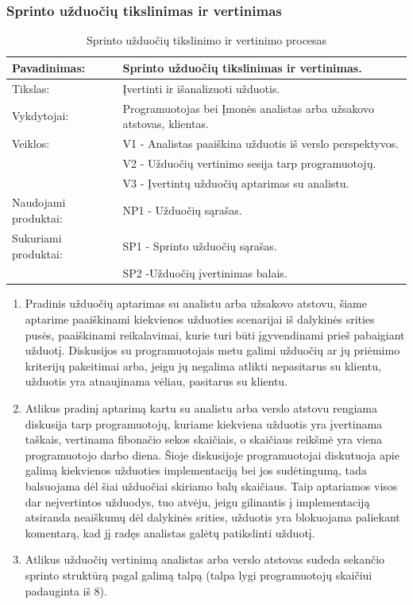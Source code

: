 \documentclass{VUMIFPSkursinis}
\begin{document}
	\subsubsection{Sprinto užduočių tikslinimas ir vertinimas}
	\begin{center}
		\begin{table}[ht]
			\caption{Sprinto užduočių tikslinimo ir vertinimo procesas}
		\begin{tabular}{ | l | l | } 
		\hline
	Pavadinimas:         & Sprinto užduočių tikslinimas ir vertinimas.          		 					 \\ \hline
	Tikslas: 	           & Įvertinti ir išanalizuoti užduotis. 																	\\ \hline
	Vykdytojai:          & Programuotojas bei Įmonės analistas arba užsakovo atstovas, klientas.  \\ \hline
	Veiklos:             & V1 - Analistas paaiškina užduotis iš verslo perspektyvos. 		          \\
											 & V2 - Užduočių vertinimo sesija tarp programuotojų.					             \\
											 & V3 - Įvertintų užduočių aptarimas su analistu. 									          \\ \hline
	Naudojami produktai: & NP1 - Užduočių sąrašas. 													 							           \\ \hline
	Sukuriami produktai: & SP1 - Sprinto užduočių sąrašas. 																	          \\ 
											 & SP2 -Užduočių įvertinimas balais.										           \\ \hline
\end{tabular}
\end{table}
\end{center}
\begin{enumerate}
	\item Pradinis užduočių aptarimas su analistu arba užsakovo atstovu, šiame aptarime paaiškinami kiekvienos užduoties scenarijai iš dalykinės srities pusės, paaiškinami reikalavimai, kurie turi būti įgyvendinami prieš pabaigiant užduotį. Diskusijos su programuotojais metu galimi užduočių ar jų priėmimo kriterijų pakeitimai arba, jeigu jų negalima atlikti nepasitarus su klientu, užduotis yra atnaujinama vėliau, pasitarus su klientu.
	\item Atlikus pradinį aptarimą kartu su analistu arba verslo atstovu rengiama diskusija tarp programuotojų, kuriame kiekviena užduotis yra įvertinama taškais, vertinama fibonačio sekos skaičiais, o skaičiaus reikšmė yra viena programuotojo darbo diena. Šioje diskusijoje programuotojai diskutuoja apie galimą kiekvienos užduoties implementaciją bei jos sudėtingumą, tada balsuojama dėl šiai užduočiai skiriamo balų skaičiaus. Taip aptariamos visos dar neįvertintos užduodys, tuo atvėju, jeigu gilinantis į implementaciją atsiranda neaiškumų dėl dalykinės srities, užduotis yra blokuojama paliekant komentarą, kad jį radęs analistas galėtų patikslinti užduotį.
	\item Atlikus užduočių vertinimą analistas arba verslo atstovas sudeda sekančio sprinto struktūrą pagal galimą talpą (talpa lygi programuotojų skaičiui padauginta iš 8). 
\end{enumerate}
\end{document}
